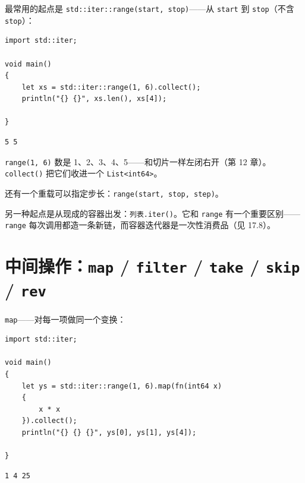 最常用的起点是 \texttt{std:\allowbreak{}:\allowbreak{}iter:\allowbreak{}:\allowbreak{}range(\allowbreak{}start,\allowbreak{} stop)\allowbreak{}}——从 \texttt{start} 到 \texttt{stop}（不含 \texttt{stop}）：

\par
\medskip
\begin{lstlisting}[style=chali]
import std::iter;

void main()
{
    let xs = std::iter::range(1, 6).collect();
    println("{} {}", xs.len(), xs[4]);

}
\end{lstlisting}
\par
\medskip

\par
\medskip
\begin{lstlisting}[style=out]
5 5
\end{lstlisting}
\par
\medskip

\texttt{range(\allowbreak{}1,\allowbreak{} 6)\allowbreak{}} 数是 1、2、3、4、5——和切片一样左闭右开（第 12 章）。\texttt{collect(\allowbreak{})\allowbreak{}} 把它们收进一个 \texttt{List<\allowbreak{}int64>\allowbreak{}}。

还有一个重载可以指定步长：\texttt{range(\allowbreak{}start,\allowbreak{} stop,\allowbreak{} step)\allowbreak{}}。

另一种起点是从现成的容器出发：\texttt{列表.\allowbreak{}iter(\allowbreak{})\allowbreak{}}。它和 \texttt{range} 有一个重要区别——\texttt{range} 每次调用都造一条新链，而容器迭代器是一次性消费品（见 17.8）。

\section{中间操作：\texttt{map} / \texttt{filter} / \texttt{take} / \texttt{skip} / \texttt{rev}}

\texttt{map}——对每一项做同一个变换：

\par
\medskip
\begin{lstlisting}[style=chali]
import std::iter;

void main()
{
    let ys = std::iter::range(1, 6).map(fn(int64 x)
    {
        x * x
    }).collect();
    println("{} {} {}", ys[0], ys[1], ys[4]);

}
\end{lstlisting}
\par
\medskip

\par
\medskip
\begin{lstlisting}[style=out]
1 4 25
\end{lstlisting}
\par
\medskip

